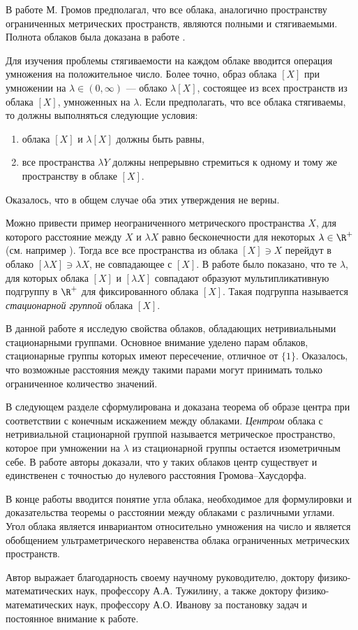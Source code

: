 В работе \cite{gromov_metric_2001} М. Громов предполагал, что все
облака, аналогично пространству ограниченных метрических пространств,
являются полными и стягиваемыми. Полнота облаков была доказана
в работе \cite{TuzhBog1}.

Для изучения проблемы стягиваемости на каждом облаке вводится
операция умножения на положительное число. Более точно, образ облака
\([X] \) при умножении на \( \lambda \in (0, \infty) \) --- облако \(
\lambda [X] \), состоящее из всех пространств из облака \( [X] \),
умноженных на \( \lambda \). Если предполагать, что все облака
стягиваемы, то должны выполняться следующие условия:
\begin{enumerate}
  \item облака \( [X] \) и \( \lambda [X] \) должны
    быть равны,
  \item все пространства \( \lambda Y \) должны непрерывно стремиться
    к одному и тому же пространству в облаке \( [X] \).
\end{enumerate}
Оказалось, что в общем случае оба этих утверждения не верны.

Можно привести пример неограниченного метрического пространства \( X
\), для которого расстояние между \( X \) и \( \lambda X \) равно
бесконечности для некоторых \( \lambda \in \R^+ \)(см. например
\cite{TuzhBog1}). Тогда все все пространства из облака \( [X] \ni X\)
перейдут в облако \( [\lambda X] \ni \lambda X \), не совпадающее с
\( [X] \). В работе \cite{TuzhBog2} было показано, что те \( \lambda
\), для которых облака \( [X] \) и \( [\lambda X] \) совпадают
образуют мультипликативную подгруппу в \( \R^+ \) для фиксированного
облака \( [X] \). Такая подгруппа называется \emph{стационарной
группой} облака \( [X] \).

В данной работе я исследую свойства облаков, обладающих
нетривиальными стационарными группами. Основное внимание уделено
парам облаков, стационарные группы которых имеют пересечение,
отличное от \( \{1\} \). Оказалось, что возможные расстояния между
такими парами могут принимать только ограниченное количество значений.

В следующем разделе сформулирована и доказана теорема об образе
центра при соответствии с конечным искажением между облаками.
\emph{Центром} облака с нетривиальной стационарной группой называется
метрическое пространство, которое при умножении на \( \lambda \) из
стационарной группы остается изометричным себе. В работе
\cite{TuzhBog2} авторы доказали, что у таких облаков центр существует
и единственен с точностью до нулевого расстояния Громова--Хаусдорфа.

В конце работы вводится понятие угла облака, необходимое для
формулировки и доказательства теоремы о расстоянии между облаками с
различными углами. Угол облака является инвариантом относительно
умножения на число и является обобщением ультраметрического
неравенства облака ограниченных метрических пространств.

Автор выражает благодарность своему научному руководителю, доктору
физико-математических наук, профессору А.А. Тужилину, а также доктору
физико-математических наук,
профессору А.О. Иванову за постановку задач и постоянное внимание к работе.
